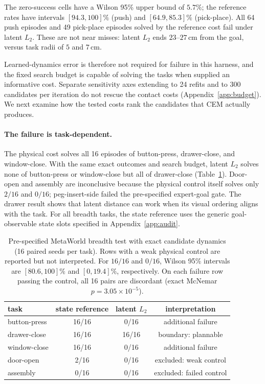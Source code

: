 \documentclass[10pt]{article}
\begin{document}
The zero-success cells have a Wilson 95\% upper bound of $5.7\%$; the reference
rates have intervals $[94.3,100]\%$ (push) and $[64.9,85.3]\%$ (pick-place).
All 64 push episodes and 49 pick-place episodes solved by the reference cost
fail under latent $L_2$. These are not near misses: latent $L_2$ ends
$23$--$27$\,cm from the goal, versus task radii of $5$ and $7$\,cm.

Learned-dynamics error is therefore not required for failure in this harness,
and the fixed search budget is capable of solving the tasks when supplied an
informative cost. Separate sensitivity axes extending to 24 refits and to 300
candidates per iteration do not rescue the contact costs
(Appendix~\ref{app:budget}). We next examine how the tested costs rank the
candidates that CEM actually produces.

\paragraph{The failure is task-dependent.}\label{sec:breadth}

The physical cost solves all 16 episodes of button-press, drawer-close, and
window-close. With the same exact outcomes and search budget, latent $L_2$
solves none of button-press or window-close but all of drawer-close
(Table~\ref{tab:breadth}). Door-open and assembly are inconclusive because the
physical control itself solves only $2/16$ and $0/16$; peg-insert-side failed
the pre-specified expert-goal gate. The drawer result shows that latent distance
can work when its visual ordering aligns with the task. For all breadth tasks,
the state reference uses the generic goal-observable state slots specified in
Appendix~\ref{app:audit}.

\begin{table}[H]
\centering
\scriptsize
\setlength{\tabcolsep}{3pt}
\caption{Pre-specified MetaWorld breadth test with exact candidate dynamics
(16 paired seeds per task). Rows with a weak physical control are reported but
not interpreted. For $16/16$ and $0/16$, Wilson 95\% intervals are
$[80.6,100]\%$ and $[0,19.4]\%$, respectively. On each failure row passing the
control, all 16 pairs are discordant (exact McNemar $p=3.05\times10^{-5}$).}
\label{tab:breadth}
\begin{tabular}{lccc}
\toprule
task & state reference & latent $L_2$ & interpretation \\
\midrule
button-press & 16/16 & 0/16 & additional failure \\
drawer-close & 16/16 & 16/16 & boundary: plannable \\
window-close & 16/16 & 0/16 & additional failure \\
door-open & 2/16 & 0/16 & excluded: weak control \\
assembly & 0/16 & 0/16 & excluded: failed control \\
\bottomrule
\end{tabular}
\end{table}
\end{document}
